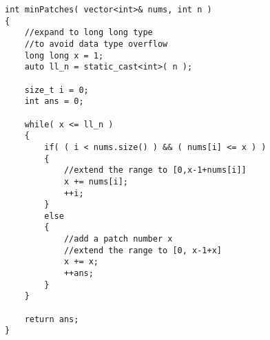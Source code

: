 \setcounter{lstlisting}{0}
\begin{lstlisting}[style=customc, caption={Dynamic Programming}]
int minPatches( vector<int>& nums, int n )
{
    //expand to long long type
    //to avoid data type overflow
    long long x = 1;
    auto ll_n = static_cast<int>( n );

    size_t i = 0;
    int ans = 0;

    while( x <= ll_n )
    {
        if( ( i < nums.size() ) && ( nums[i] <= x ) )
        {
            //extend the range to [0,x-1+nums[i]]
            x += nums[i];
            ++i;
        }
        else
        {
            //add a patch number x
            //extend the range to [0, x-1+x]
            x += x;
            ++ans;
        }
    }

    return ans;
}

\end{lstlisting}


